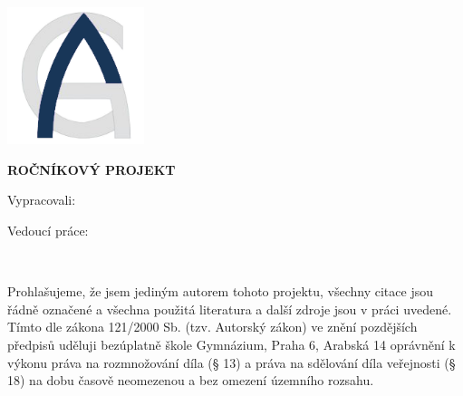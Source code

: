 
\pagestyle{empty}
\hypersetup{pageanchor=false}

\begin{center}

{\LARGE\bfseries\NazevSkoly}

\vspace{-18mm}
\vfill

{\LARGE\NazevOboru}

\vfill

\centerline{\mbox{\includegraphics[height=4cm]{../img/logo.png}}}

\vspace{-8mm}
\vfill

{\bf\Large ROČNÍKOVÝ PROJEKT}

\vfill


\vspace{15mm}

{\LARGE\bfseries\NazevPrace}


\vfill


Vypracovali: \hfill \AutorPrace

Vedoucí práce: \hfill \Vedouci

\vspace{15mm}
\MesicOdevzdani \ \RokOdevzdani

\end{center}



\newpage
\hypersetup{pageanchor=true}
\pagestyle{plain}


\openright


\vspace*{\fill}


\noindent
Prohlašujeme, že jsem jediným autorem tohoto projektu, všechny citace jsou
řádně označené a všechna použitá literatura a další zdroje jsou v práci uvedené.
Tímto dle zákona 121/2000 Sb. (tzv. Autorský zákon) ve znění pozdějších předpisů uděluji
bezúplatně škole Gymnázium, Praha 6, Arabská 14 oprávnění k výkonu práva na rozmnožování díla
(§ 13) a práva na sdělování díla veřejnosti (§ 18) na dobu časově neomezenou a bez omezení
územního rozsahu.


